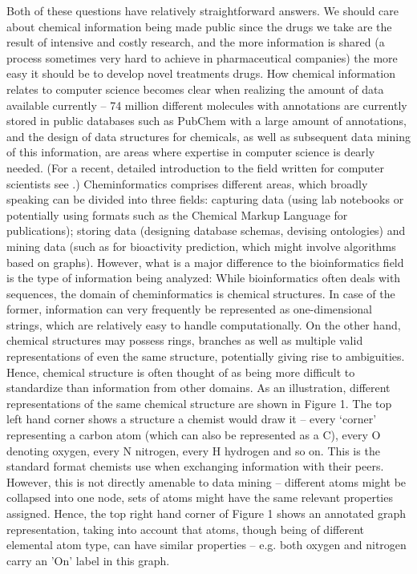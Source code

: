 \documentclass{sig-alternate}
\begin{document}
Both of these questions have relatively straightforward answers. We should care
about chemical information being made public since the drugs we take are the
result of intensive and costly research, and the more information is shared (a
process sometimes very hard to achieve in pharmaceutical companies) the more
easy it should be to develop novel treatments drugs. How chemical information
relates to computer science becomes clear when realizing the amount of data
available currently – 74 million different molecules with annotations are
currently stored in public databases such as PubChem with a large amount of
annotations, and the design of data structures for chemicals, as well as
subsequent data mining of this information, are areas where expertise in
computer science is dearly needed. (For a recent, detailed introduction to the
field written for computer scientists see \cite{brown2009} .) Cheminformatics comprises
different areas, which broadly speaking can be divided into three fields:
capturing data (using lab notebooks or potentially using formats such as the
Chemical Markup Language for publications); storing data (designing database
schemas, devising ontologies) and mining data (such as for bioactivity
prediction, which might involve algorithms based on graphs). However, what is a
major difference to the bioinformatics field is the type of information being
analyzed: While bioinformatics often deals with sequences, the domain of
cheminformatics is chemical structures. In case of the former, information can
very frequently be represented as one-dimensional strings, which are relatively
easy to handle computationally. On the other hand, chemical structures may
possess rings, branches as well as multiple valid representations of even the
same structure, potentially giving rise to ambiguities. Hence, chemical
structure is often thought of as being more difficult to standardize than
information from other domains. As an illustration, different representations of
the same chemical structure are shown in Figure 1. The top left hand corner
shows a structure a chemist would draw it – every ‘corner’ representing a carbon
atom (which can also be represented as a C), every O denoting oxygen, every N
nitrogen, every H hydrogen and so on. This is the standard format chemists use
when exchanging information with their peers. However, this is not directly
amenable to data mining -- different atoms might be collapsed into one node, sets
of atoms might have the same relevant properties assigned. Hence, the top right
hand corner of Figure 1 shows an annotated graph representation, taking into
account that atoms, though being of different elemental atom type, can have
similar properties -- e.g. both oxygen and nitrogen carry an 'On' label in this
graph.
\end{document}
